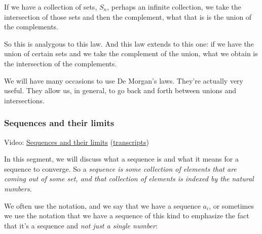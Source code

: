 \documentclass[pdftex, brazil, 12pt, twoside]{article}
\begin{document}
\begin{figure}[H]
  \begin{center}
  \end{center}
\end{figure}

If we have a collection of sets, $S_n$, perhaps an infinite
collection, we take the intersection of those sets and
then the complement, what that is is the union of the
complements.

So this is analygous to this law.
And this law extends to this one: if we have the union of
certain sets and we take the complement of the union, what
we obtain is the intersection of the complements.

We will have many occasions to use De Morgan's laws.
They're actually very useful.
They allow us, in general, to go back and forth between
unions and intersections.

\subsubsection{Sequences and their limits}
\label{un1-math-sequences}

Video: \href{https://www.youtube.com/watch?v=60ug2YVjdhU}{Sequences and their limits}
(\href{Unit-1/02\_mathematical\_background/mb\_4\_transcripts.pdf}{transcripts})

In this segment, we will discuss what a sequence is and
what it means for a sequence to converge.
So a \emph{sequence is some collection of elements
that are coming out of some set, and that collection of
elements is indexed by the natural numbers}.

We often use the notation, and we say that we have a sequence
$a_i$, or sometimes we use the notation that we have a
sequence of this kind to emphasize the fact that it's a
sequence and \emph{not just a single number}:

\begin{figure}[H]
  \begin{center}
  \end{center}
\end{figure}
\end{document}
